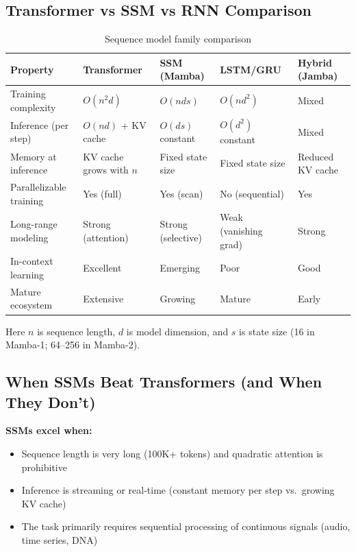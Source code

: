 \subsection{Transformer vs SSM vs RNN Comparison}

\begin{table}[H]
\centering
\caption{Sequence model family comparison}
\begin{tabularx}{\textwidth}{lXXXX}
\toprule
\textbf{Property} & \textbf{Transformer} & \textbf{SSM (Mamba)} & \textbf{LSTM/GRU} & \textbf{Hybrid (Jamba)} \\
\midrule
Training complexity & $O(n^2 d)$ & $O(n d s)$ & $O(n d^2)$ & Mixed \\
Inference (per step) & $O(nd)$ + KV cache & $O(d s)$ constant & $O(d^2)$ constant & Mixed \\
Memory at inference & KV cache grows with $n$ & Fixed state size & Fixed state size & Reduced KV cache \\
Parallelizable training & Yes (full) & Yes (scan) & No (sequential) & Yes \\
Long-range modeling & Strong (attention) & Strong (selective) & Weak (vanishing grad) & Strong \\
In-context learning & Excellent & Emerging & Poor & Good \\
Mature ecosystem & Extensive & Growing & Mature & Early \\
\bottomrule
\end{tabularx}
\end{table}

Here $n$ is sequence length, $d$ is model dimension, and $s$ is state size (16 in Mamba-1; 64--256 in Mamba-2).

\subsection{When SSMs Beat Transformers (and When They Don't)}

\textbf{SSMs excel when:}
\begin{itemize}
    \item Sequence length is very long (100K+ tokens) and quadratic attention is prohibitive
    \item Inference is streaming or real-time (constant memory per step vs.\ growing KV cache)
    \item The task primarily requires sequential processing of continuous signals (audio, time series, DNA)
\end{itemize}

